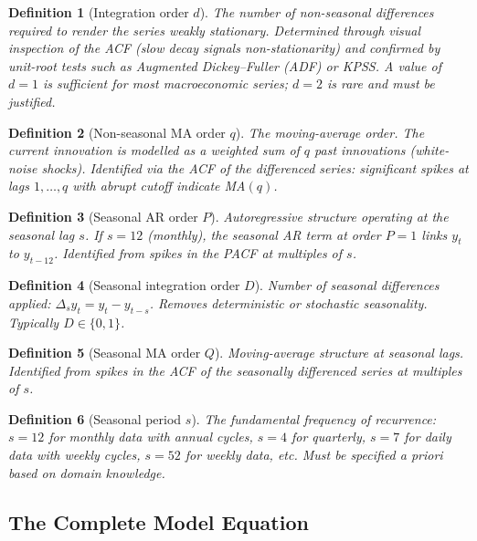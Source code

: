 \documentclass[12pt,a4paper]{article}
\newtheorem{definition}{Definition}[section]
\begin{document}
\begin{definition}[Integration order $d$]
The number of non-seasonal differences required to render the series weakly
stationary. Determined through visual inspection of the ACF (slow decay signals
non-stationarity) and confirmed by unit-root tests such as Augmented
Dickey--Fuller (ADF) or KPSS. A value of $d=1$ is sufficient for most
macroeconomic series; $d=2$ is rare and must be justified.
\end{definition}

\begin{definition}[Non-seasonal MA order $q$]
The moving-average order. The current innovation is modelled as a weighted sum
of $q$ past innovations (white-noise shocks). Identified via the ACF of the
differenced series: significant spikes at lags $1,\dots,q$ with abrupt cutoff
indicate MA$(q)$.
\end{definition}

\begin{definition}[Seasonal AR order $P$]
Autoregressive structure operating at the seasonal lag $s$. If $s=12$ (monthly),
the seasonal AR term at order $P=1$ links $y_t$ to $y_{t-12}$. Identified from
spikes in the PACF at multiples of $s$.
\end{definition}

\begin{definition}[Seasonal integration order $D$]
Number of seasonal differences applied: $\Delta_s y_t = y_t - y_{t-s}$. Removes
deterministic or stochastic seasonality. Typically $D\in\{0,1\}$.
\end{definition}

\begin{definition}[Seasonal MA order $Q$]
Moving-average structure at seasonal lags. Identified from spikes in the ACF of
the seasonally differenced series at multiples of $s$.
\end{definition}

\begin{definition}[Seasonal period $s$]
The fundamental frequency of recurrence: $s=12$ for monthly data with annual
cycles, $s=4$ for quarterly, $s=7$ for daily data with weekly cycles, $s=52$
for weekly data, etc. Must be specified a priori based on domain knowledge.
\end{definition}

\subsection{The Complete Model Equation}
\end{document}
